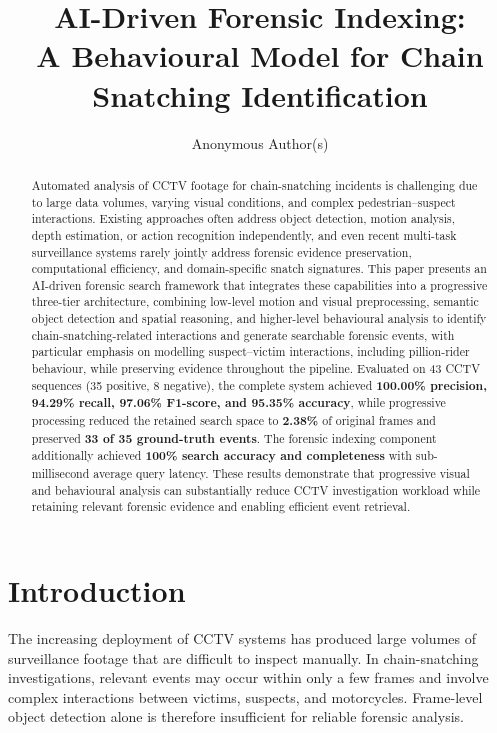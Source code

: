 \documentclass[runningheads]{llncs}
\title{AI-Driven Forensic Indexing:\\
A Behavioural Model for Chain Snatching Identification}
\author{Anonymous Author(s)}
\begin{document}
\maketitle

\begin{abstract}
Automated analysis of CCTV footage for chain-snatching incidents is
challenging due to large data volumes, varying visual conditions, and
complex pedestrian--suspect interactions. Existing approaches often
address object detection, motion analysis, depth estimation, or action
recognition independently, and even recent multi-task surveillance
systems rarely jointly address forensic evidence preservation,
computational efficiency, and domain-specific snatch signatures. This
paper presents an AI-driven forensic search framework that integrates
these capabilities into a progressive three-tier architecture,
combining low-level motion and visual preprocessing, semantic object
detection and spatial reasoning, and higher-level behavioural analysis
to identify chain-snatching-related interactions and generate
searchable forensic events, with particular emphasis on modelling
suspect--victim interactions, including pillion-rider behaviour, while
preserving evidence throughout the pipeline. Evaluated on 43 CCTV sequences (35 positive, 8 negative), the complete
system achieved \textbf{100.00\% precision, 94.29\% recall, 97.06\%
F1-score, and 95.35\% accuracy}, while progressive processing reduced
the retained search space to \textbf{2.38\%} of original frames and
preserved \textbf{33 of 35 ground-truth events}. The forensic indexing
component additionally achieved \textbf{100\% search accuracy and
completeness} with sub-millisecond average query latency. These results
demonstrate that progressive visual and behavioural analysis can
substantially reduce CCTV investigation workload while retaining
relevant forensic evidence and enabling efficient event retrieval.
\end{abstract}


\section{Introduction}

The increasing deployment of CCTV systems has produced large volumes of
surveillance footage that are difficult to inspect manually. In
chain-snatching investigations, relevant events may occur within only a
few frames and involve complex interactions between victims, suspects,
and motorcycles. Frame-level object detection alone is therefore
insufficient for reliable forensic analysis.
\end{document}
